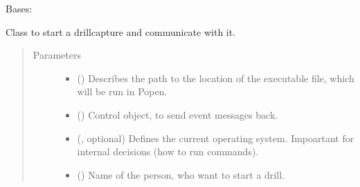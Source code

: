 \documentclass[letterpaper,10pt,english]{sphinxmanual}
\begin{document}
\begin{fulllineitems}
\label{\detokenize{anoog.automation:anoog.automation.py_exe_interface.Drillcapture_Interface}}
\sphinxAtStartPar
Bases: {\hyperref[\detokenize{anoog.automation:anoog.automation.py_exe_interface.Process_Interface}]{}}

\sphinxAtStartPar
Class to start a drillcapture and communicate with it.
\begin{quote}\begin{description}
\item[{Parameters}] \leavevmode\begin{itemize}
\item {} 
\sphinxAtStartPar
{} () \textendash{} Describes the path to the location of the executable file, which will be run in Popen.

\item {} 
\sphinxAtStartPar
{} ({\hyperref[\detokenize{anoog.automation:anoog.automation.controller.Terminal}]{}}) \textendash{} Control object, to send event messages back.

\item {} 
\sphinxAtStartPar
{} ({\hyperref[\detokenize{anoog.automation:anoog.automation.py_exe_interface.op}]{}}, optional) \textendash{} Defines the current operating system. Impoartant for internal decisions (how to run commands).

\item {} 
\sphinxAtStartPar
{} (\sphinxstyleliteralemphasis{\sphinxupquote{, }}) \textendash{} Name of the person, who want to start a drill.


\end{itemize}
\end{description}
\end{quote}
\end{fulllineitems}
\end{document}
